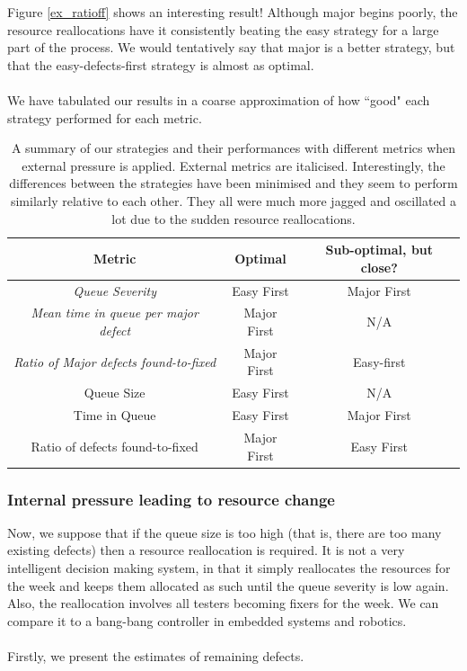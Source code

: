 Figure \ref{ex_ratioff} shows an interesting result! Although major begins poorly, the resource
reallocations have it consistently beating the easy strategy for a large part of the process.
We would tentatively say that major is a better strategy, but that the easy-defects-first strategy
is almost as optimal.\\
\\
We have tabulated our results in a coarse approximation of how ``good" each strategy performed for
each metric.

\begin{table}[ht!]
	\centering
	\begin{tabular}{|c|c|c|}
	\hline
	{\bf Metric} & {\bf Optimal} & {\bf Sub-optimal, but close?} \\ \hline
	{\em Queue Severity} & Easy First & Major First \\ \hline
	{\em Mean time in queue per major defect} & Major First & N/A\\ \hline
	{\em Ratio of Major defects found-to-fixed} & Major First & Easy-first \\ \hline
	Queue Size & Easy First & N/A \\ \hline
	Time in Queue & Easy First & Major First \\ \hline
	Ratio of defects found-to-fixed & Major First & Easy First\\ \hline
	\end{tabular}
	\caption{A summary of our strategies and their performances with different metrics when external
pressure is applied.
External metrics are italicised.
Interestingly, the differences between the strategies have been minimised and they seem to perform
similarly relative to each other.
They all were much more jagged and oscillated a lot due to the sudden resource reallocations.}
	\label{summaryex}
\end{table}

\subsubsection{Internal pressure leading to resource change}

Now, we suppose that if the queue size is too high (that is, there are too many existing defects) then a resource reallocation is required.
It is not a very intelligent decision making system, in that it simply reallocates the resources for
the week and keeps them allocated as such until the queue severity is low again.
Also, the reallocation involves all testers becoming fixers for the week.
We can compare it to a bang-bang controller in embedded systems and robotics.\\
\\
Firstly, we present the estimates of remaining defects.

